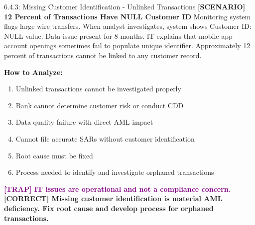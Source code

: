 \documentclass[11pt,a4paper]{beamer}
\newcommand{\trap}[1]{\textcolor{purple}{\textbf{[TRAP] #1}}}
\newcommand{\correct}[1]{\textcolor{green!50!black}{\textbf{[CORRECT] #1}}}
\newcommand{\scenario}[1]{\textcolor{blue!70!black}{\textbf{[SCENARIO] #1}}}
\begin{document}
\begin{frame}{6.4.3: Missing Customer Identification - Unlinked Transactions}
	\scenario{12 Percent of Transactions Have NULL Customer ID}
	Monitoring system flags large wire transfers. When analyst investigates, system shows Customer ID: NULL value. Data issue present for 8 months. IT explains that mobile app account openings sometimes fail to populate unique identifier. Approximately 12 percent of transactions cannot be linked to any customer record.
	
	\vspace{0.1cm}
	\textbf{How to Analyze:}
	\begin{enumerate}
		\item Unlinked transactions cannot be investigated properly
		\item Bank cannot determine customer risk or conduct CDD
		\item Data quality failure with direct AML impact
		\item Cannot file accurate SARs without customer identification
		\item Root cause must be fixed
		\item Process needed to identify and investigate orphaned transactions
	\end{enumerate}
	\trap{IT issues are operational and not a compliance concern.}
	\correct{Missing customer identification is material AML deficiency. Fix root cause and develop process for orphaned transactions.}
\end{frame}
\end{document}
